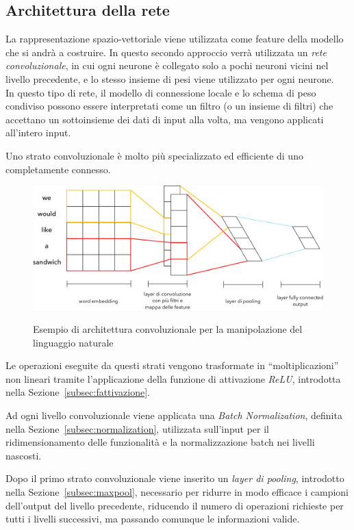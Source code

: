 \subsection{Architettura della rete}
\label{subsec:modelli2}

La rappresentazione spazio-vettoriale viene utilizzata come feature della modello che si andrà a costruire.
In questo secondo approccio verrà utilizzata un \emph{rete convoluzionale}, in cui ogni neurone è collegato solo a pochi neuroni vicini nel livello precedente, e lo stesso insieme di pesi viene utilizzato per ogni neurone.\\

In questo tipo di rete, il modello di connessione locale e lo schema di peso condiviso possono essere interpretati come un filtro (o un insieme di filtri) che accettano un sottoinsieme dei dati di input alla volta, ma vengono applicati all'intero input.

Uno strato convoluzionale è molto più specializzato ed efficiente di uno completamente connesso.

\begin{figure}[H]
	\centering
	{\includegraphics[width=.85\textwidth]{images/cnn}} 
	\caption{Esempio di architettura convoluzionale per la manipolazione del linguaggio naturale}
	\label{fig:cnn}
\end{figure}

Le operazioni eseguite da questi strati vengono trasformate in ``moltiplicazioni'' non lineari tramite l'applicazione della funzione di attivazione \emph{ReLU}, introdotta nella Sezione~\ref{subsec:fattivazione}.

Ad ogni livello convoluzionale viene applicata una \emph{Batch Normalization}, definita nella Sezione~\ref{subsec:normalization}, utilizzata sull'input per il ridimensionamento delle funzionalità e la normalizzazione batch nei livelli nascosti.

Dopo il primo strato convoluzionale viene inserito un \emph{layer di pooling}, introdotto nella Sezione~\ref{subsec:maxpool}, necessario per ridurre in modo efficace i campioni dell'output del livello precedente, riducendo il numero di operazioni richieste per tutti i livelli successivi, ma passando comunque le informazioni valide.

